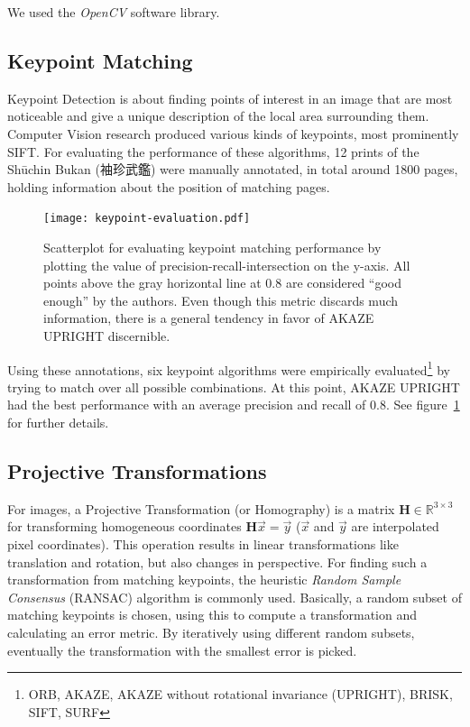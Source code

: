 \documentclass{ltjarticle}
\begin{document}
We used the \emph{OpenCV} software library.\cite{opencv_library}

\subsection{Keypoint Matching}

Keypoint Detection\cite[Ch.4]{szeliski2010computer} is about finding points of interest in an image that are most noticeable and give a unique description of the local area surrounding them. Computer Vision research produced various kinds of keypoints, most prominently SIFT.\cite{lowe2004sift} For evaluating the performance of these algorithms, 12 prints of the Shūchin Bukan (袖珍武鑑) were manually annotated, in total around 1800 pages, holding information about the position of matching pages.

\begin{figure}[p]
    \centering
    \texttt{[image: keypoint-evaluation.pdf]}
    \caption[Scatterplot of keypoint matching performance]{Scatterplot for evaluating keypoint matching performance by plotting the value of precision-recall-intersection on the y-axis. All points above the gray horizontal line at $0.8$ are considered “good enough” by the authors. Even though this metric discards much information, there is a general tendency in favor of AKAZE UPRIGHT discernible.}
    \label{fig:keypoint-evaluation}
\end{figure}

Using these annotations, six keypoint algorithms were empirically evaluated\footnote{ORB\cite{rublee2011orb}, AKAZE\cite{alcantarilla2011fast}, AKAZE without rotational invariance (UPRIGHT), BRISK\cite{leutenegger2011brisk}, SIFT, SURF\cite{bay2006surf}} by trying to match over all possible combinations. At this point, AKAZE UPRIGHT had the best performance with an average precision and recall of $0.8$. See figure~\ref{fig:keypoint-evaluation} for further details.

\subsection{Projective Transformations}

For images, a Projective Transformation (or Homography) is a matrix $\mathbf{H} \in \mathbb{R}^{3 \times 3}$ for transforming homogeneous coordinates $\mathbf{H}\vec{x} = \vec{y}$ ($\vec{x}$ and $\vec{y}$ are interpolated pixel coordinates). This operation results in linear transformations like translation and rotation, but also changes in perspective.\cite{marschner2015fundamentals} For finding such a transformation from matching keypoints, the heuristic \emph{Random Sample Consensus} (RANSAC) algorithm is commonly used.\cite{fischler1981random} Basically, a random subset of matching keypoints is chosen, using this to compute a transformation and calculating an error metric. By iteratively using different random subsets, eventually the transformation with the smallest error is picked.
\end{document}
